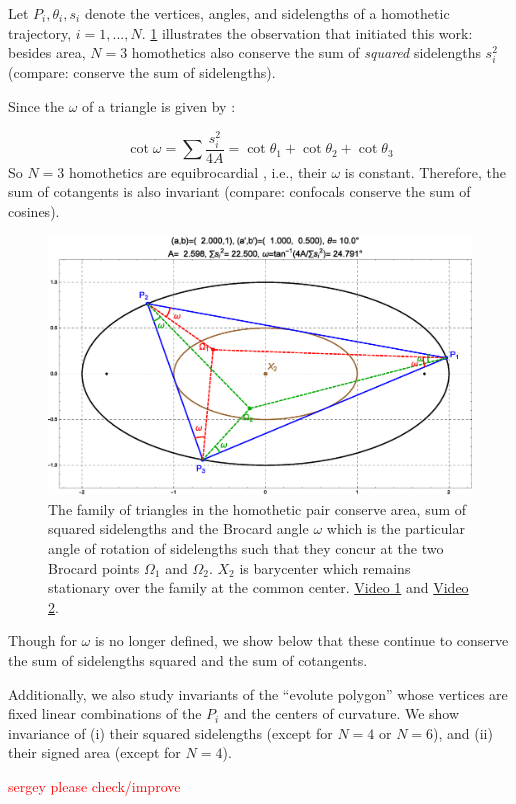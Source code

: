 Let $P_i,\theta_i,s_i$ denote the vertices, angles, and sidelengths of a homothetic trajectory, $i=1,...,N$. \cref{fig:brocard-n3} illustrates the observation that initiated this work: besides area, $N=3$ homothetics also conserve the sum of {\em squared} sidelengths $s_i^2$ (compare:  conserve the sum of sidelengths).

Since the  $\omega$ of a triangle is given by \cite[Brocard Angle, Eqn. 2]{mw}:

\[ \cot\omega=\sum\frac{s_i^2}{4A}=\cot\theta_1+\cot\theta_2+\cot\theta_3 \]
So $N=3$ homothetics are equibrocardial \cite{johnson1960}, i.e., their $\omega$ is constant. Therefore, the sum of cotangents is also invariant  (compare: confocals conserve the sum of cosines).

\begin{figure}
    \centering
\includegraphics[width=\textwidth]{pics/0040_brocard_n3.eps}
\caption{The family of triangles in the homothetic pair conserve area, sum of squared sidelengths and the Brocard angle $\omega$ which is the particular angle of rotation of sidelengths such that they concur at the two Brocard points $\Omega_1$ and $\Omega_2$. $X_2$ is barycenter which remains stationary over the family at the common center. \href{https://youtu.be/2fvGd8wioZY}{Video 1} and \href{https://youtu.be/13i3JGY-fK4}{Video 2}.}
    \label{fig:brocard-n3}
\end{figure}

Though for 
$\omega$ is no longer defined,
we show below that these continue to conserve the sum of sidelengths squared and the sum of cotangents. 

Additionally, we also study invariants of the ``evolute polygon'' whose vertices are fixed linear combinations of the $P_i$ and the centers of curvature. We show invariance of (i) their squared sidelengths (except for $N=4$ or $N=6$), and (ii) their signed area (except for $N=4$).

\textcolor{red}{sergey please check/improve}

